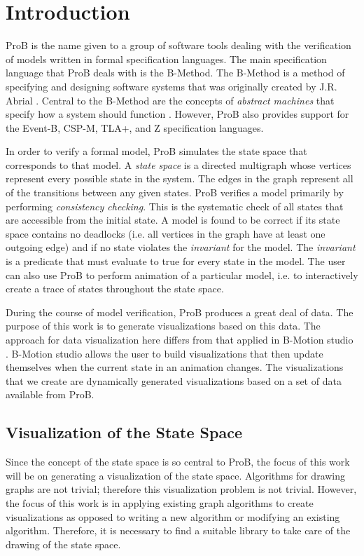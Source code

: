 \section{Introduction}

ProB is the name given to a group of software tools dealing with the verification of models written in formal specification languages. The main specification language that ProB deals with is the B-Method. The B-Method is a method of specifying and designing software systems that was originally created by J.R. Abrial \cite{abrial2005b}. Central to the B-Method are the concepts of \emph{abstract machines} that specify how a system should function \cite{schneider2001b}. However, ProB also provides support for the Event-B, CSP-M, TLA+, and Z specification languages. 

In order to verify a formal model, ProB simulates the state space that corresponds to that model. A \emph{state space} is a directed multigraph whose vertices represent every possible state in the system. The edges in the graph represent all of the transitions between any given states. ProB verifies a model primarily by performing \emph{consistency checking}. This is the systematic check of all states that are accessible from the initial state. A model is found to be correct if its state space contains no deadlocks (i.e. all vertices in the graph have at least one outgoing edge) and if no state violates the \emph{invariant} for the model. The \emph{invariant} is a predicate that must evaluate to true for every state in the model. The user can also use ProB to perform animation of a particular model, i.e. to interactively create a trace of states throughout the state space.

During the course of model verification, ProB produces a great deal of data. The purpose of this work is to generate visualizations based on this data. The approach for data visualization here differs from that applied in B-Motion studio \cite{LaBeLe09_258}. B-Motion studio allows the user to build visualizations that then update themselves when the current state in an animation changes. The visualizations that we create are dynamically generated visualizations based on a set of data available from ProB.

\subsection{Visualization of the State Space}

Since the concept of the state space is so central to ProB, the focus of this work will be on generating a visualization of the state space. Algorithms for drawing graphs are not trivial; therefore this visualization problem is not trivial. However, the focus of this work is in applying existing graph algorithms to create visualizations as opposed to writing a new algorithm or modifying an existing algorithm. Therefore, it is necessary to find a suitable library to take care of the drawing of the state space.

